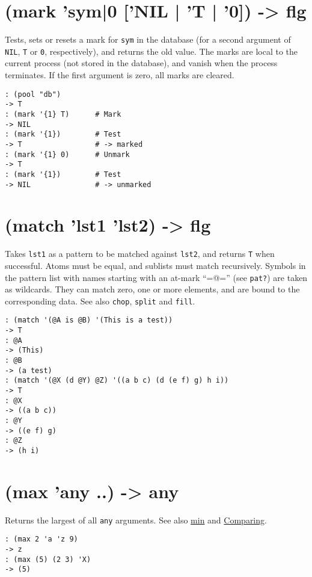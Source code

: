 {{{{{{{ 
\section{(mark 'sym|0 ['NIL | 'T | '0]) -> flg}
\label{sec-8-1-13-15}


Tests, sets or resets a mark for \texttt{sym} in the database (for a second
argument of \texttt{NIL}, \texttt{T} or \texttt{0}, respectively), and returns the old value.
The marks are local to the current process (not stored in the database),
and vanish when the process terminates. If the first argument is zero,
all marks are cleared.


\begin{verbatim}
: (pool "db")
-> T
: (mark '{1} T)      # Mark
-> NIL
: (mark '{1})        # Test
-> T                 # -> marked
: (mark '{1} 0)      # Unmark
-> T
: (mark '{1})        # Test
-> NIL               # -> unmarked
\end{verbatim}

 
\section{(match 'lst1 'lst2) -> flg}
\label{sec-8-1-13-16}


Takes \texttt{lst1} as a pattern to be matched against \texttt{lst2}, and returns \texttt{T}
when successful. Atoms must be equal, and sublists must match
recursively. Symbols in the pattern list with names starting with an
at-mark ``=@='' (see \texttt{pat?}) are taken as wildcards. They can match zero,
one or more elements, and are bound to the corresponding data. See also
\texttt{chop}, \texttt{split} and \texttt{fill}.


\begin{verbatim}
: (match '(@A is @B) '(This is a test))
-> T
: @A
-> (This)
: @B
-> (a test)
: (match '(@X (d @Y) @Z) '((a b c) (d (e f) g) h i))
-> T
: @X
-> ((a b c))
: @Y
-> ((e f) g)
: @Z
-> (h i)
\end{verbatim}

 
\section{(max 'any ..) -> any}
\label{sec-8-1-13-17}


Returns the largest of all \texttt{any} arguments. See also
\hyperref[refM.html-min]{min} and \hyperref[ref.html-cmp]{Comparing}.


\begin{verbatim}
: (max 2 'a 'z 9)
-> z
: (max (5) (2 3) 'X)
-> (5)
\end{verbatim}

}}}}}}}
